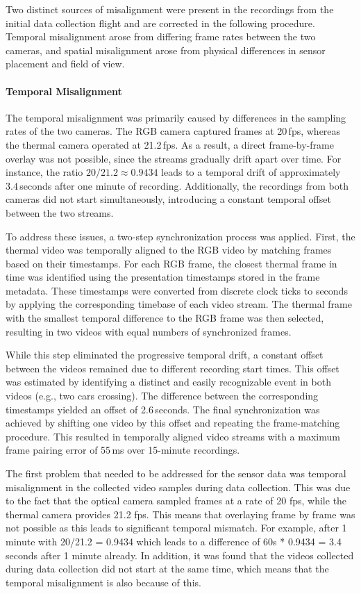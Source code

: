 \documentclass[12pt,oneside,bibtotoc,liststotoc]{scrbook}
\begin{document}
Two distinct sources of misalignment were present in the recordings from the initial
data collection flight and are corrected in the following procedure.
Temporal misalignment arose from differing frame rates between the two cameras, and spatial
misalignment arose from physical differences in sensor placement and field of view.

\vspace{-0.6em}
\paragraph{Temporal Misalignment}
The temporal misalignment was primarily caused by differences in the sampling
rates of the two cameras. The RGB camera captured frames at 20\,fps, whereas
the thermal
camera operated at 21.2\,fps. As a result, a direct frame-by-frame overlay
was not possible, since the streams gradually drift apart over time. For
instance, the ratio $20 / 21.2 \approx 0.9434$ leads to a temporal drift of
approximately $3.4$\,seconds after one minute of recording.
Additionally, the recordings from both cameras did not start simultaneously,
introducing a constant temporal offset between the two streams.

To address these issues, a two-step synchronization process was applied.
First, the thermal video was temporally aligned to the RGB video by matching
frames based on their timestamps. For each RGB frame, the closest thermal
frame in time was identified using the presentation timestamps stored in the
frame metadata. These timestamps were converted from discrete clock ticks to
seconds by applying the corresponding timebase of each video stream. The
thermal frame with the smallest temporal difference to the RGB frame was then
selected, resulting in two videos with equal numbers of synchronized frames.

While this step eliminated the progressive temporal drift, a constant offset
between the videos remained due to different recording start times. This
offset was estimated by identifying a distinct and easily recognizable event
in both videos (e.g., two cars crossing). The difference between the
corresponding timestamps yielded an offset of 2.6\,seconds.
The final synchronization was achieved by shifting one video by this offset
and repeating the frame-matching procedure. This resulted in temporally
aligned video streams with a maximum frame pairing error of 55\,ms over
15-minute recordings.

The first problem that needed to be addressed for the sensor data
was temporal misalignment in the collected video samples during data
collection. This was due to the fact that the optical camera sampled
frames at a rate of 20 fps, while the thermal camera provides 21.2 fps.
This means that overlaying frame by frame was not possible as this
leads to significant temporal mismatch. For example, after 1 minute with
20/21.2 = 0.9434 which leads to a difference of 60s * 0.9434 = 3.4 seconds
after 1 minute already.
In addition, it was found that the videos collected during data collection did not start
at the same time, which means that the temporal misalignment is also because of this.
\end{document}
